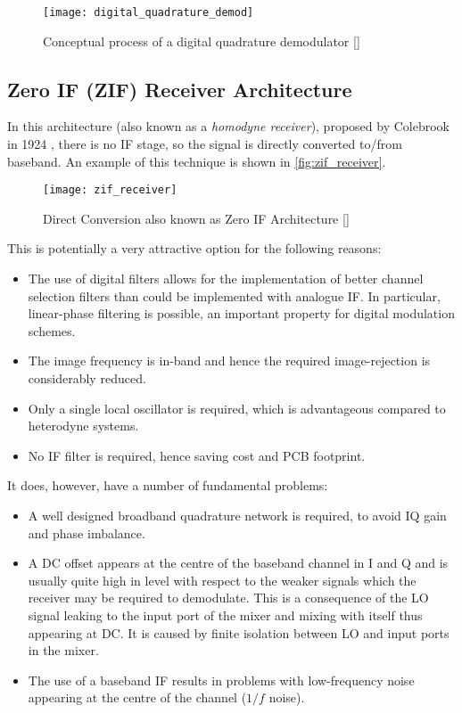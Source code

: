 \begin{figure}[ht]
  \centering
  \texttt{[image: digital\_quadrature\_demod]}
  \caption{Conceptual process of a digital quadrature demodulator [\citeauthor{rf_bb_techniques_sdr}]}
  \label{fig:digital_quadrature_demod}
\end{figure}

\subsection{Zero IF (ZIF) Receiver Architecture}
\label{sect:zif_arch}

In this architecture (also known as a \emph{homodyne receiver}), proposed by Colebrook in 1924 \cite{homodyne}, there is no IF stage, so the signal is directly converted to/from baseband. An example of this technique is shown in \autoref{fig:zif_receiver}.

\begin{figure}[H]
  \centering
  \texttt{[image: zif\_receiver]}
  \caption{Direct Conversion also known as Zero IF Architecture [\citeauthor{rf_bb_techniques_sdr}]}
  \label{fig:zif_receiver}
\end{figure}

This is potentially a very attractive option for the following reasons:
\begin{itemize}
  \item The use of digital filters allows for the implementation of better channel selection filters than could be implemented with analogue IF. In particular, linear-phase filtering is possible, an important property for digital modulation schemes.
  \item The image frequency is in-band and hence the required image-rejection is considerably reduced.
  \item Only a single local oscillator is required, which is advantageous compared to heterodyne systems.
  \item No IF filter is required, hence saving cost and PCB footprint.
\end{itemize}

It does, however, have a number of fundamental problems:
\begin{itemize}
  \item A well designed broadband quadrature network is required, to avoid IQ gain and phase imbalance.
  \item A DC offset appears at the centre of the baseband channel in I and Q and is usually quite high in level with respect to the weaker signals which the receiver may be required to demodulate. This is a consequence of the LO signal leaking to the input port of the mixer and mixing with itself thus appearing at DC. It is caused by finite isolation between LO and input ports in the mixer.
  \item The use of a baseband IF results in problems with low-frequency noise appearing at the centre of the channel ($1/f$ noise).
\end{itemize}

